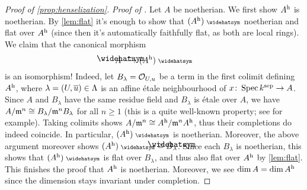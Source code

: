 \begin{proof}[Proof of \cref{prop:henselization}]
	\emph{Proof of .} Let $A$ be noetherian. We first show $A^{\mathrm{h}}$ is noetherian. By \cref{lem:flat} it's enough to show that $(A^\h)^\complete$ noetherian and flat over $A^{\mathrm{h}}$ (since then it's automatically faithfully flat, as both are local rings). We claim that the canonical morphism
	\begin{equation}\label{eq:AhComplete}
		\roof{A}\isomorphism(A^\h)^\complete
	\end{equation}
	is an isomorphism! Indeed, let $B_\lambda=\mathcal{O}_{U,u}$ be a term in the first colimit defining $A^{\mathrm{h}}$, where $\lambda=(U,\ov{u})\in\Lambda$ is an affine étale neighbourhood of $x\colon \Spec k^\sep\morphism A$. Since $A$ and $B_\lambda$ have the same residue field and $B_\lambda$ is étale over $A$, we have $A/\mathfrak{m}^n\cong B_\lambda/\mathfrak{m}^nB_\lambda$ for all $n\geq 1$ (this is a quite well-known property; see \cite[Lemma~A.4.2]{jacobians} for example). Taking colimits shows $A/\mathfrak{m}^n\cong A^{\mathrm{h}}/\mathfrak{m}^nA^{\mathrm{h}}$, thus their completions do indeed coincide. In particular, $(A^\h)^\complete$ is noetherian. Moreover, the above argument moreover shows $(A^\h)^\complete\cong \roof{B}_\lambda$. Since each $B_\lambda$ is noetherian, this shows that $(A^\h)^\complete$ is flat over $B_\lambda$, and thus also flat over $A^{\mathrm{h}}$ by \cref{lem:flat}. This finishes the proof that $A^{\mathrm{h}}$ is noetherian. Moreover, we see $\dim A=\dim A^{\mathrm{h}}$ since the dimension stays invariant under completion.
	

\end{proof}
